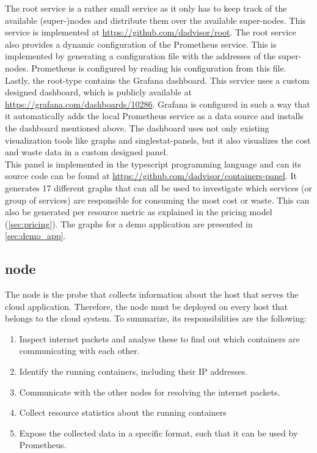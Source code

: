 \noindent
The root service is a rather small service as it only has to keep track of the available (super-)nodes and distribute them over the available super-nodes. This service is implemented at \url{https://github.com/dadvisor/root}. The root service also provides a dynamic configuration of the Prometheus service. This is implemented by generating a configuration file with the addresses of the super-nodes. Prometheus is configured by reading his configuration from this file.\\

\noindent
Lastly, the root-type contains the Grafana dashboard. This service uses a custom designed dashboard, which is publicly available at \url{https://grafana.com/dashboards/10286}. Grafana is configured in such a way that it automatically adds the local Prometheus service as a data source and installs the dashboard mentioned above. The dashboard uses not only existing visualization tools like graphs and singlestat-panels, but it also visualizes the cost and waste data in a custom designed panel.\\

\noindent
This panel is implemented in the typescript programming language and can its source code can be found at \url{https://github.com/dadvisor/containers-panel}. It generates 17 different graphs that can all be used to investigate which services (or group of services) are responsible for consuming the most cost or waste. This can also be generated per resource metric as explained in the pricing model (\autoref{sec:pricing}). The graphs for a demo application are presented in \autoref{sec:demo_app}.

\subsection{node}
The node is the probe that collects information about the host that serves the cloud application. Therefore, the node must be deployed on every host that belongs to the cloud system. To summarize, its responsibilities are the following:
\begin{enumerate}
    \item Inspect internet packets and analyse these to find out which containers are communicating with each other.
    \item Identify the running containers, including their IP addresses.
    \item Communicate with the other nodes for resolving the internet packets.
    \item Collect resource statistics about the running containers
    \item Expose the collected data in a specific format, such that it can be used by Prometheus.
\end{enumerate}

